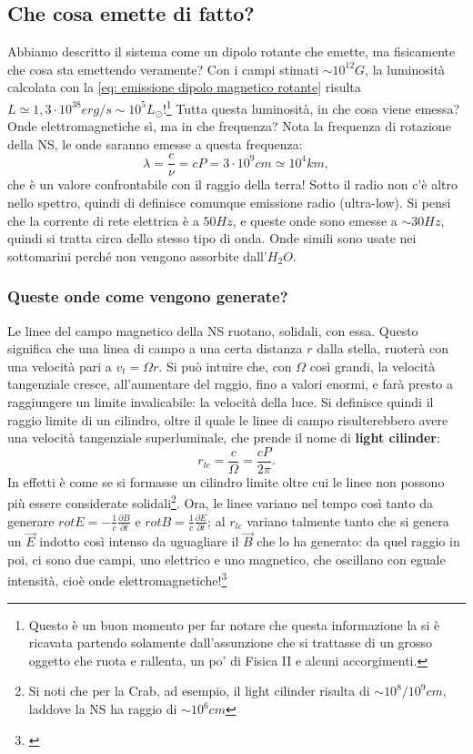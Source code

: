 \subsection{Che cosa emette di fatto?}
Abbiamo descritto il sistema come un dipolo rotante che emette, ma fisicamente che cosa sta emettendo veramente?
Con i campi stimati $\sim10^{12}G$, la luminosità calcolata con la \eqref{eq: emissione dipolo magnetico rotante} risulta $L\simeq 1,3\cdot10^{38}erg/s \sim 10^5L_{\odot} $!\footnote{Questo è un buon momento per far notare che questa informazione la si è ricavata partendo solamente dall'assunzione che si trattasse di un grosso oggetto che ruota e rallenta, un po' di Fisica II e alcuni accorgimenti.}
Tutta questa luminosità, in che cosa viene emessa? Onde elettromagnetiche sì, ma in che frequenza?
Nota la frequenza di rotazione della NS, le onde saranno emesse a questa frequenza:
\begin{equation}
    \lambda = \frac{c}{\nu}= cP = 3\cdot10^{9}cm \simeq 10^4km,
\end{equation}
che è un valore confrontabile con il raggio della terra!
Sotto il radio non c'è altro nello spettro, quindi di definisce comunque emissione radio (ultra-low).
Si pensi che la corrente di rete elettrica è a $50Hz$, e queste onde sono emesse a $\sim30Hz$, quindi si tratta circa dello stesso tipo di onda. 
Onde simili sono usate nei sottomarini perché non vengono assorbite dall'$H_2O$.
\subsubsection{Queste onde come vengono generate?}
Le linee del campo magnetico della NS ruotano, solidali, con essa.
Questo significa che una linea di campo a una certa distanza $r$ dalla stella, ruoterà con una velocità pari a $v_t=\Omega r$.
Si può intuire che, con $\Omega$ così grandi, la velocità tangenziale cresce, all'aumentare del raggio, fino a valori enormi, e farà presto a raggiungere un limite invalicabile: la velocità della luce.
Si definisce quindi il raggio limite di un cilindro, oltre il quale le linee di campo risulterebbero avere una velocità tangenziale superluminale, che prende il nome di \textbf{light cilinder}:
\begin{equation}
    r_{lc}=\frac{c}{\Omega}=\frac{cP}{2\pi}.
    \label{eq: raggio light cilinder}
\end{equation}
In effetti è come se si formasse un cilindro limite oltre cui le linee non possono più essere considerate solidali\footnote{Si noti che per la Crab, ad esempio, il light cilinder risulta di $\sim 10^8/10^9 cm$, laddove la NS ha raggio di $\sim10^6cm$}.
Ora, le linee variano nel tempo così tanto da generare $rotE = -\frac{1}{c}\frac{\partial B}{\partial t} $ e $rotB = \frac{1}{c}\frac{\partial E}{\partial t} $; al $r_{lc}$ variano talmente tanto che si genera un $\vec{E}$ indotto così intenso da uguagliare il $\vec{B}$ che lo ha generato:
da quel raggio in poi, ci sono due campi, uno elettrico e uno magnetico, che oscillano con eguale intensità, cioè onde elettromagnetiche!\footnote{\cite{Harding2022}}

